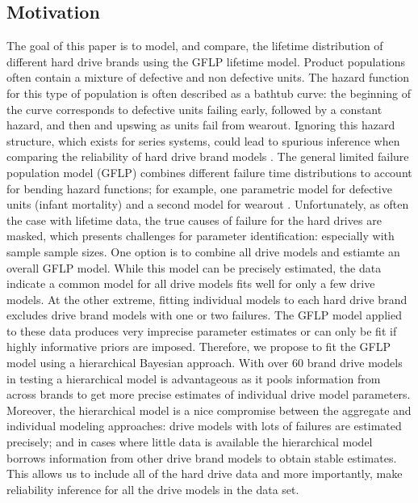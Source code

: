\documentclass[12pt]{article}
\begin{document}
\subsection{Motivation}
The goal of this paper is to model, and compare, the lifetime distribution of different hard drive brands using the GFLP lifetime model.  Product populations often contain a mixture of defective and non defective units.  The hazard function for this type of population is often described as a bathtub curve: the beginning of the curve corresponds to defective units failing early, followed by a constant hazard, and then and upswing as units fail from wearout.  Ignoring this hazard structure, which exists for series systems, could lead to spurious inference when comparing the reliability of hard drive brand models \cite{sujata}.  The general limited failure population model (GFLP) combines different failure time distributions to account for bending hazard functions; for example, one parametric model for defective units (infant mortality) and a second model for wearout \cite{chan}.  Unfortunately, as often the case with lifetime data, the true causes of failure for the hard drives are masked, which presents challenges for parameter identification: especially with sample sample sizes. One option is to combine all drive models and estiamte an overall GFLP model.  While this model can be precisely estimated, the data indicate a common model for all drive models fits well for only a few drive models.  At the other extreme, fitting individual models to each hard drive brand excludes drive brand models with one or two failures.  The GFLP model applied to these data produces very imprecise parameter estimates or can only be fit if highly informative priors are imposed.  Therefore, we propose to fit the GFLP model using a hierarchical Bayesian approach.  With over 60 brand drive models in testing a hierarchical model is advantageous as it pools information from across brands to get more precise estimates of individual drive model parameters.  Moreover, the hierarchical model is a nice compromise between the aggregate and individual modeling approaches: drive models with lots of failures are estimated precisely; and in cases where little data is available the hierarchical model borrows information from other drive brand models to obtain stable estimates.  This allows us to include all of the hard drive data and more importantly, make reliability inference for all the drive models in the data set. 
\end{document}
